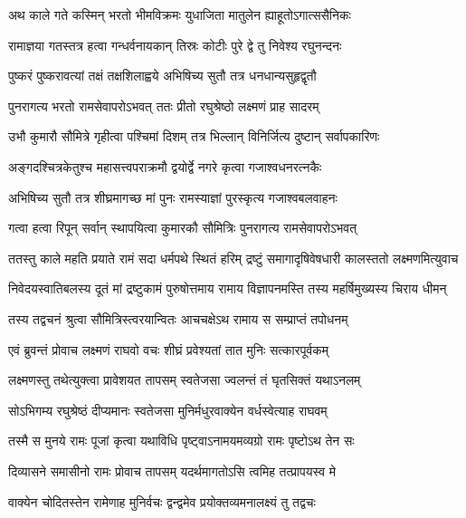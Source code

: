 

\twolineshloka
{अथ काले गते कस्मिन् भरतो भीमविक्रमः}
{युधाजिता मातुलेन ह्याहूतोऽगात्ससैनिकः} %

\twolineshloka
{रामाज्ञया गतस्तत्र हत्वा गन्धर्वनायकान्}
{तिस्रः कोटीः पुरे द्वे तु निवेश्य रघुनन्दनः} %

\twolineshloka
{पुष्करं पुष्करावत्यां तक्षं तक्षशिलाह्वये}
{अभिषिच्य सुतौ तत्र धनधान्यसुहृद्वृतौ} %

\twolineshloka
{पुनरागत्य भरतो रामसेवापरोऽभवत्}
{ततः प्रीतो रघुश्रेष्ठो लक्ष्मणं प्राह सादरम्} %

\twolineshloka
{उभौ कुमारौ सौमित्रे गृहीत्वा पश्चिमां दिशम्}
{तत्र भिल्लान् विनिर्जित्य दुष्टान् सर्वापकारिणः} %

\twolineshloka
{अङ्गदश्चित्रकेतुश्च महासत्त्वपराक्रमौ}
{द्वयोर्द्वे नगरे कृत्वा गजाश्वधनरत्नकैः} %

\twolineshloka
{अभिषिच्य सुतौ तत्र शीघ्रमागच्छ मां पुनः}
{रामस्याज्ञां पुरस्कृत्य गजाश्वबलवाहनः} %

\twolineshloka
{गत्वा हत्वा रिपून् सर्वान् स्थापयित्वा कुमारकौ}
{सौमित्रिः पुनरागत्य रामसेवापरोऽभवत्} %

\fourlineindentedshloka
{ततस्तु काले महति प्रयाते}
{रामं सदा धर्मपथे स्थितं हरिम्}
{द्रष्टुं समागादृषिवेषधारी}
{कालस्ततो लक्ष्मणमित्युवाच} %

\fourlineindentedshloka
{निवेदयस्वातिबलस्य दूतं}
{मां द्रष्टुकामं पुरुषोत्तमाय}
{रामाय विज्ञापनमस्ति तस्य}
{महर्षिमुख्यस्य चिराय धीमन्} %

\twolineshloka
{तस्य तद्वचनं श्रुत्वा सौमित्रिस्त्वरयान्वितः}
{आचचक्षेऽथ रामाय स सम्प्राप्तं तपोधनम्} %

\twolineshloka
{एवं ब्रुवन्तं प्रोवाच लक्ष्मणं राघवो वचः}
{शीघ्रं प्रवेश्यतां तात मुनिः सत्कारपूर्वकम्} %

\twolineshloka
{लक्ष्मणस्तु तथेत्युक्त्वा प्रावेशयत तापसम्}
{स्वतेजसा ज्वलन्तं तं घृतसिक्तं यथाऽनलम्} %

\twolineshloka
{सोऽभिगम्य रघुश्रेष्ठं दीप्यमानः स्वतेजसा}
{मुनिर्मधुरवाक्येन वर्धस्वेत्याह राघवम्} %

\twolineshloka
{तस्मै स मुनये रामः पूजां कृत्वा यथाविधि}
{पृष्ट्वाऽनामयमव्यग्रो रामः पृष्टोऽथ तेन सः} %

\twolineshloka
{दिव्यासने समासीनो रामः प्रोवाच तापसम्}
{यदर्थमागतोऽसि त्वमिह तत्प्रापयस्व मे} %

\twolineshloka
{वाक्येन चोदितस्तेन रामेणाह मुनिर्वचः}
{द्वन्द्वमेव प्रयोक्तव्यमनालक्ष्यं तु तद्वचः} %

